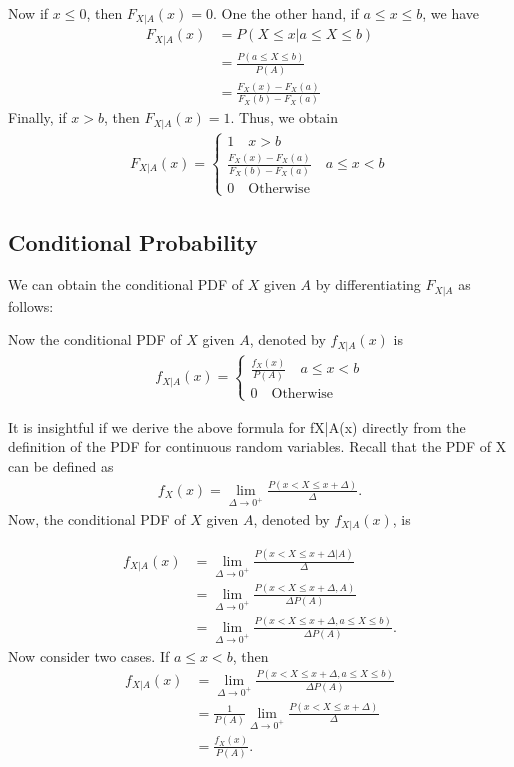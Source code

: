 Now if $x\leq 0$, then $F_{X|A}(x)=0$. One the other hand, if $a\leq x \leq b$, we have
\begin{align*}
	F_{X|A}(x)&= P(X\leq x|a\leq X \leq b)\\
			&= \frac{P(a\leq X \leq b)}{P(A)}\\
			&= \frac{F_X(x)-F_X(a)}{F_X(b)-F_X(a)}
\end{align*}
Finally, if $x>b$, then $F_{X|A}(x)=1$. Thus, we obtain
\begin{align*}
F_{X|A}(x)=
	\begin{cases}
	1\quad x>b\\	
	\frac{F_X(x)-F_X(a)}{F_X(b)-F_X(a)}\quad a\leq x <b\\	
	0\quad \text{Otherwise}\
	\end{cases}
\end{align*}

\subsection{Conditional Probability}
We can obtain the conditional PDF of $X$ given $A$ by differentiating $F_{X|A}$ as follows:

Now the conditional PDF of $X$ given $A$, denoted by $f_{X|A}(x)$ is 
\begin{align*}
	f_{X|A}(x) = 
	\begin{cases}
	\frac{f_{X}(x)}{P(A)}\quad a\leq x <b\\	
	0\quad \text{Otherwise}\
	\end{cases}
\end{align*}

It is insightful if we derive the above formula for fX|A(x) directly from the definition of the PDF for continuous random variables. Recall that the PDF of X can be defined as
\begin{align*}
	f_X(x)=\lim_{\Delta \rightarrow 0^+} \frac{P(x<X \leq x+\Delta)}{\Delta}.
\end{align*}
Now, the conditional PDF of $X$ given $A$, denoted by $f_{X|A}(x)$, is

\begin{align*}
	 f_{X|A}(x)&=\lim_{\Delta \rightarrow 0^+} \frac{P(x<X \leq x+\Delta|A)}{\Delta}\\
	 &=\lim_{\Delta \rightarrow 0^+} \frac{P(x<X \leq x+\Delta,A)}{\Delta P(A)}\\
	 &=\lim_{\Delta \rightarrow 0^+} \frac{P(x<X \leq x+\Delta,a \leq X \leq b)}{\Delta P(A)}.
\end{align*}
Now consider two cases. If $a\leq x < b$, then
\begin{align*}
	 f_{X|A}(x)&=\lim_{\Delta \rightarrow 0^+} \frac{P(x<X \leq x+\Delta,a \leq X \leq b)}{\Delta P(A)}\\
	 &=\frac{1}{P(A)}\lim_{\Delta \rightarrow 0^+} \frac{P(x<X \leq x+\Delta)}{\Delta}\\
	 &=\frac{f_X(x)}{P(A)}.
\end{align*}

